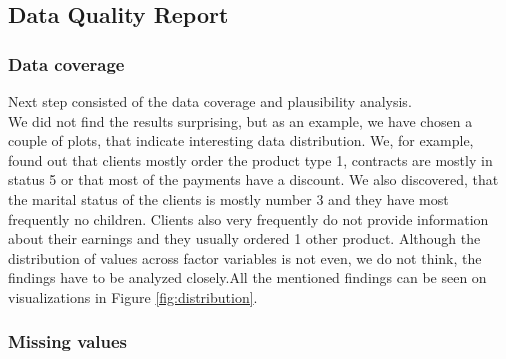 \documentclass[
]{article}
\begin{document}
\hypertarget{data-quality-report}{%
\subsection{Data Quality Report}\label{data-quality-report}}

\hypertarget{data-coverage}{%
\subsubsection{Data coverage}\label{data-coverage}}

Next step consisted of the data coverage and plausibility analysis.\\
We did not find the results surprising, but as an example, we have chosen a couple of plots, that indicate interesting data distribution. We, for example, found out that clients mostly order the product type 1, contracts are mostly in status 5 or that most of the payments have a discount. We also discovered, that the marital status of the clients is mostly number 3 and they have most frequently no children. Clients also very frequently do not provide information about their earnings and they usually ordered 1 other product. Although the distribution of values across factor variables is not even, we do not think, the findings have to be analyzed closely.All the mentioned findings can be seen on visualizations in Figure \ref{fig:distribution}.

\hypertarget{missing-values}{%
\subsubsection{Missing values}\label{missing-values}}
\end{document}

